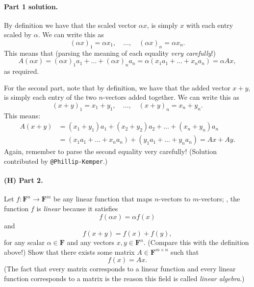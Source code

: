 \documentclass[12pt,hidelinks]{article}
\newcommand{\field}{\mathbf{F}}
\begin{document}
\begin{solution}
\paragraph{Part 1 solution.} By definition we have that the scaled
vector $\alpha x$, is simply $x$ with each entry scaled by $\alpha$.
We can write this as
\[
    (\alpha x)_1 = \alpha x_1, \quad \dots, \quad (\alpha x)_n = \alpha x_n.
\]
This means that (parsing the meaning of each equality \emph{very carefully}!)
\[
    A(\alpha x) = (\alpha x)_1a_1 + \dots + (\alpha x)_na_n = \alpha (x_1 a_1 + \dots + x_n a_n) = \alpha Ax,
\]
as required.

For the second part, note that by definition, we have that the added vector $x
+ y$, is simply each entry of the two $n$-vectors added together. We can write
this as
\[
    (x + y)_1 = x_1 + y_1, \quad \dots, \quad (x + y)_n = x_n + y_n.
\]
This means:
\[
    \begin{aligned}
        A(x + y) &= (x_1 + y_1) a_1 + (x_2 + y_2) a_2 +  \dots + (x_n + y_n) a_n\\
                 &= (x_1 a_1 + \dots + x_n a_n) + (y_1 a_1 + \dots + y_n a_n) = Ax + Ay.
    \end{aligned}
\]
Again, remember to parse the second equality very carefully! (Solution
contributed by \verb|@Phillip-Kemper|.)
\end{solution}

\paragraph{(H) Part 2.} Let $f: \field^n \to \field^m$ be any linear function that maps
$n$-vectors to $m$-vectors;
\ie, the function $f$ is \emph{linear} because it satisfies
\[
    f(\alpha x) = \alpha f(x)
\]
and 
\[
    f(x + y) = f(x) + f(y),
\]
for any scalar $\alpha \in \field$ and any vectors $x, y \in \field^n$.
(Compare this with the definition above!) Show that there exists some matrix $A
\in \field^{m \times n}$ such that
\[
    f(x) = Ax.
\]
(The fact that every matrix corresponds to a linear function and every linear
function corresponds to a matrix is the reason this field is called
\emph{linear algebra}.)
\end{document}
